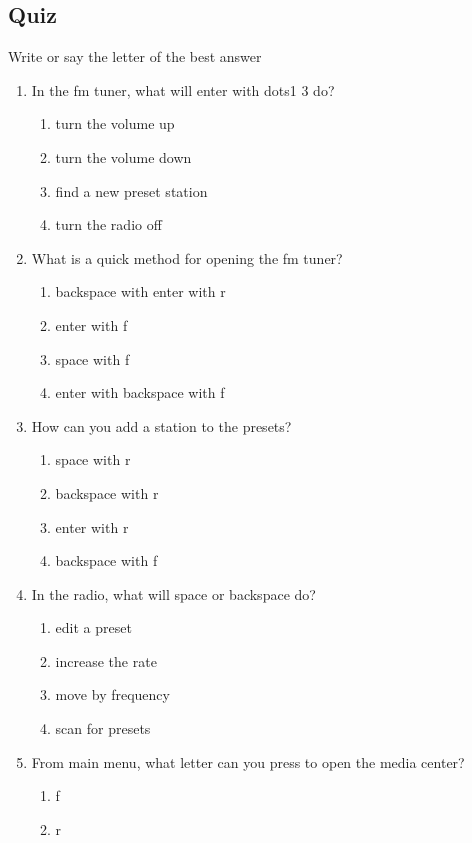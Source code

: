 \documentclass[10pt,letterpaper,twoside]{report}
\begin{document}
{{{\subsection{Quiz}
Write or say the letter of the best answer
	      \begin{enumerate}
		      \item In the fm tuner, what will enter with dots1 3 do?
		  \begin{enumerate}
		      \item turn the volume up
		      \item turn the volume down
		      \item find a new preset station
		      \item turn the radio off
	      \end{enumerate}
	\item What is a quick method for opening the fm tuner?
	      \begin{enumerate}
		      \item backspace with enter with r
		      \item enter with f
		      \item space with f
		      \item enter with backspace with f
	      \end{enumerate}
	\item How can you add a station to the presets?
	      \begin{enumerate}
		      \item space with r
		      \item backspace with r
		      \item enter with r
		      \item backspace with f
	      \end{enumerate}
	\item In the radio, what will space or backspace do?
	      \begin{enumerate}
		      \item edit a preset
		      \item increase the rate
		      \item move by frequency
		      \item scan for presets
	      \end{enumerate}
	\item From main menu, what letter can you press to open the media center?
	      \begin{enumerate}
		      \item f
		      \item r

\end{enumerate}
\end{enumerate}}}}
\end{document}
